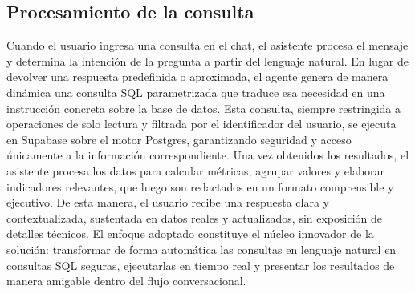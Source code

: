\subsection{Procesamiento de la consulta}
Cuando el usuario ingresa una consulta en el chat, el asistente procesa el mensaje y determina la intención de la pregunta a partir del lenguaje natural. En lugar de devolver una respuesta predefinida o aproximada, el agente genera de manera dinámica una consulta SQL parametrizada que traduce esa necesidad en una instrucción concreta sobre la base de datos. Esta consulta, siempre restringida a operaciones de solo lectura y filtrada por el identificador del usuario, se ejecuta en Supabase sobre el motor Postgres, garantizando seguridad y acceso únicamente a la información correspondiente. Una vez obtenidos los resultados, el asistente procesa los datos para calcular métricas, agrupar valores y elaborar indicadores relevantes, que luego son redactados en un formato comprensible y ejecutivo. De esta manera, el usuario recibe una respuesta clara y contextualizada, sustentada en datos reales y actualizados, sin exposición de detalles técnicos. El enfoque adoptado constituye el núcleo innovador de la solución: transformar de forma automática las consultas en lenguaje natural en consultas SQL seguras, ejecutarlas en tiempo real y presentar los resultados de manera amigable dentro del flujo conversacional.

